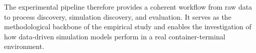 The experimental pipeline therefore provides a coherent workflow from raw data to process discovery, simulation discovery, and evaluation. It serves as the methodological backbone of the empirical study and enables the investigation of how data-driven simulation models perform in a real container-terminal environment.
